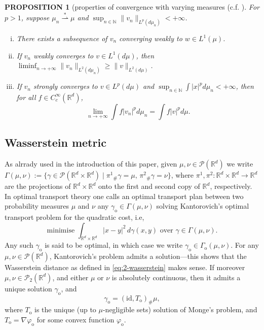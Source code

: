 \documentclass[11pt,leqno]{amsart}
\newtheorem{prop}[thm]{PROPOSITION}
\theoremstyle{definition}
\newcommand{\bes}{\begin{equation*}}
\newcommand{\ees}{\end{equation*}}
\newcommand{\R}{{\mathord{\mathbb R}}}
\newcommand{\Rd}{{\mathord{\mathbb R}^d}}
\newcommand{\grad}{\nabla}
\newcommand{\wsto}{\stackrel{*}{\rightharpoonup}}
\def\P{{\mathcal P}}
\begin{document}
\begin{prop}[properties of convergence with varying measures {(c.f. \cite[Theorem 5.4.4]{AGS}}] \label{AGSthm}
For $p>1$, suppose $\mu_n \wsto \mu$ and  $\sup_{n \in \mathbb{N}} \| v_n\|_{L^p(d \mu_n)} <+\infty$.
\begin{enumerate}[(i)]
\item There exists a subsequence of $v_n$ converging weakly to $w \in L^1(\mu)$. \label{weakcpt}
\item If $v_n$ weakly converges to $v \in L^1(d \mu)$, then $\liminf_{n \to +\infty} \|v_n\|_{L^2(d \mu_n)} \geq \|v\|_{L^2(d \mu)}$. \label{weaklsc}
\item If $v_n$ strongly converges to $v \in L^p(d \mu)$ and $\sup_{n \in \mathbb{N}} \int |x|^p d \mu_n <+\infty$, then for all $f \in C^\infty_c(\Rd)$,
\[ \lim_{n \to +\infty} \int f |v_n|^p d \mu_n = \int f |v|^p d \mu . \] \label{strongcty}
\end{enumerate}
\end{prop}
\subsection{Wasserstein metric}

As alrrady used in the introduction of this paper, given $\mu,\nu\in\P(\R^d)$ we write $\Gamma(\mu,\nu) := \{\gamma \in\P(\R^d\times\R^d) \mid {\pi^1}_\# \gamma = \mu,\, {\pi^2}_\# \gamma = \nu\}$, where $\pi^1,\pi^2\colon \R^d \times \R^d \to \R^d$ are the projections of $\R^d\times \R^d$ onto the first and second copy of $\R^d$, respectively. In optimal transport theory one calls an optimal transport plan between two probability measures $\mu$ and $\nu$ any $\gamma_\mathrm{o} \in \Gamma(\mu,\nu)$ solving Kantorovich's optimal transport problem for the quadratic cost, i.e, 
\bes
	 \mbox{minimise  $\displaystyle \int_{\R^d\times \R^d} |x-y|^2 \,d\gamma(x,y)$ over $\gamma\in \Gamma(\mu,\nu)$}.
\ees
Any such $\gamma_\mathrm{o}$ is said to be optimal, in which case we write $\gamma_\mathrm{o} \in \Gamma_\mathrm{o}(\mu,\nu)$. For any $\mu,\nu\in\P(\R^d)$, Kantorovich's problem admits a solution---this shows that the Wasserstein distance as defined in \eqref{eq:2-wasserstein} makes sense. If moreover $\mu,\nu\in\P_2(\R^d)$, and either $\mu$ or $\nu$ is absolutely continuous, then it admits a unique solution $\gamma_\mathrm{o}$, and
\bes
	\gamma_\mathrm{o} = (\text{id},T_\mathrm{o})_\#\mu,
\ees
where $T_\mathrm{o}$ is the unique (up to $\mu$-negligible sets) solution of Monge's problem, and $T_\mathrm{o} = \grad \varphi_\mathrm{o}$ for some convex function $\varphi_\mathrm{o}$. 
\end{document}
